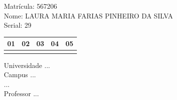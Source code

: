 \documentclass[10pt,a4paper,twocolumn]{report}
\begin{document}
Matrícula: 567206\\ Nome: LAURA MARIA FARIAS PINHEIRO DA SILVA \\ Serial: 29\\
\begin{tabular}{|l|l|l|l|l|}\hline
01  &02  &03  &04  &05 \\ \hline 
 & & & & \\ \hline 
\end{tabular}
 \cleardoublepage 

\begin{flushleft}
Universidade ...\\
Campus ...\\
...\\
Professor ...\\
\end{flushleft}
\end{document}
